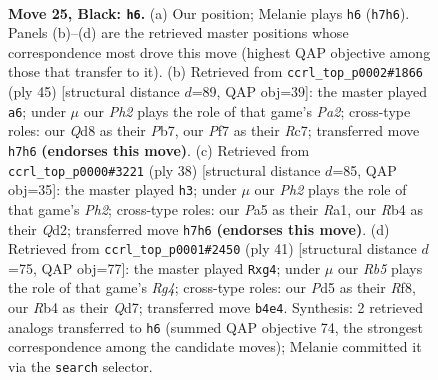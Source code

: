 \documentclass[11pt]{article}
\begin{document}
\clearpage

\begin{figure}[p]\centering
\begin{subfigure}{0.46\textwidth}\centering
\resizebox{\linewidth}{!}{%
\newchessgame
\chessboard[
  setfen={r2qb1k1/p4ppp/5n2/p2pN3/1r4PP/1P1B4/PQ3P2/R3R1K1 b - - 6 25},
  showmover=false,
  pgfstyle=straightmove, color=movearrow, markmove={h7-h6}
]}
\caption{}
\end{subfigure}\hfill
\begin{subfigure}{0.46\textwidth}\centering
\resizebox{\linewidth}{!}{%
\newchessgame
\chessboard[
  setfen={3q2k1/ppr2pp1/4rnp1/2bp4/B7/P1N1P1PP/1P1Q1P2/2R2RK1 b - - 2 23},
  showmover=false,
  pgfstyle=straightmove, color=movearrow, markmove={a7-a6}
]}
\caption{}
\end{subfigure}
\\[4pt]
\begin{subfigure}{0.46\textwidth}\centering
\resizebox{\linewidth}{!}{%
\newchessgame
\chessboard[
  setfen={1rbr2k1/3nqpp1/4p2p/4P3/1p1P4/5N2/3QBPPP/RR4K1 w - - 2 20},
  showmover=false,
  pgfstyle=straightmove, color=movearrow, markmove={h2-h3}
]}
\caption{}
\end{subfigure}\hfill
\begin{subfigure}{0.46\textwidth}\centering
\resizebox{\linewidth}{!}{%
\newchessgame
\chessboard[
  setfen={5rk1/p2q2bp/5np1/2pp2r1/6P1/2NBP2Q/PPP2P2/2K3RR b - - 4 21},
  showmover=false,
  pgfstyle=straightmove, color=movearrow, markmove={g5-g4}
]}
\caption{}
\end{subfigure}
\caption{\textbf{Move 25, Black: \texttt{h6}.} (a) Our position; Melanie plays \texttt{h6} (\texttt{h7h6}). Panels (b)--(d) are the retrieved master positions whose correspondence most drove this move (highest QAP objective among those that transfer to it). (b) Retrieved from \texttt{ccrl\_top\_p0002\#1866} (ply 45) [structural distance $d$=89, QAP obj=39]: the master played \texttt{a6}; under $\mu$ our \emph{Ph2} plays the role of that game's \emph{Pa2}; cross-type roles: our \emph{Q}d8 as their \emph{P}b7, our \emph{P}f7 as their \emph{R}c7; transferred move \texttt{h7h6} \textbf{(endorses this move)}. (c) Retrieved from \texttt{ccrl\_top\_p0000\#3221} (ply 38) [structural distance $d$=85, QAP obj=35]: the master played \texttt{h3}; under $\mu$ our \emph{Ph2} plays the role of that game's \emph{Ph2}; cross-type roles: our \emph{P}a5 as their \emph{R}a1, our \emph{R}b4 as their \emph{Q}d2; transferred move \texttt{h7h6} \textbf{(endorses this move)}. (d) Retrieved from \texttt{ccrl\_top\_p0001\#2450} (ply 41) [structural distance $d$=75, QAP obj=77]: the master played \texttt{Rxg4}; under $\mu$ our \emph{Rb5} plays the role of that game's \emph{Rg4}; cross-type roles: our \emph{P}d5 as their \emph{R}f8, our \emph{R}b4 as their \emph{Q}d7; transferred move \texttt{b4e4}. Synthesis: 2 retrieved analogs transferred to \texttt{h6} (summed QAP objective 74, the strongest correspondence among the candidate moves); Melanie committed it via the \texttt{search} selector.}
\label{fig:thought-m49}
\end{figure}
\end{document}
